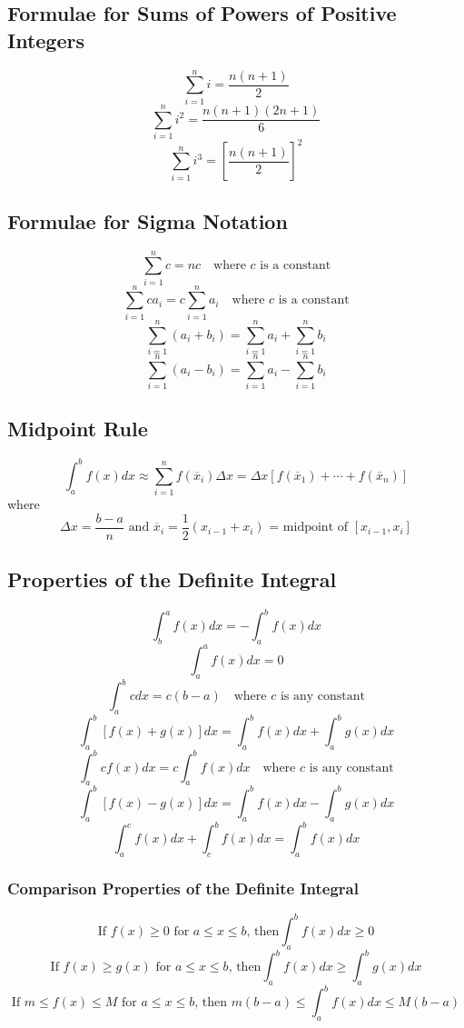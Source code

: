 \subsection*{Formulae for Sums of Powers of Positive Integers}

$$ \sum_{i=1}^n i=\frac{n(n+1)}{2} $$
$$ \sum_{i=1}^n i^2=\frac{n(n+1)(2n+1)}{6} $$
$$ \sum_{i=1}^n i^3= {\left [ \frac{n(n+1)}{2} \right]}^2 $$

\subsection*{Formulae for Sigma Notation}

$$ \sum_{i=1}^n c=nc \quad \text{where } c \text{ is a constant} $$
$$ \sum_{i=1}^n ca_i=c \sum_{i=1}^n a_i \quad \text{where } c \text{ is a constant} $$
$$ \sum_{i=1}^n (a_i+b_i)=\sum_{i=1}^n a_i + \sum_{i=1}^n b_i $$
$$ \sum_{i=1}^n (a_i-b_i)=\sum_{i=1}^n a_i - \sum_{i=1}^n b_i $$

\subsection*{Midpoint Rule}

$$ \int_a^b f(x)dx \approx \sum_{i=1}^{n} f(\overline{x}_i) \Delta x = \Delta x [f(\overline{x}_1)+\cdots+f(\overline{x}_n)]$$
where 
$$ \Delta x = \frac{b-a}{n} \text{ and } \overline{x}_i = \frac{1}{2}(x_{i-1} + x_i) \text{ = midpoint of } [x_{i-1},x_i] $$

\subsection*{Properties of the Definite Integral}

$$ \int_b^a f(x)dx = -\int_a^b f(x)dx $$
$$ \int_a^a f(x)dx = 0 $$
$$ \int_a^b c dx = c(b-a) \quad \text{where } c \text{ is any constant} $$
$$ \int_a^b [f(x)+g(x)] dx = \int_a^b f(x)dx + \int_a^b g(x)dx $$
$$ \int_a^b cf(x) dx = c\int_a^b f(x) dx \quad \text{where } c \text{ is any constant} $$
$$ \int_a^b [f(x)-g(x)] dx = \int_a^b f(x)dx - \int_a^b g(x)dx $$
$$ \int_a^c f(x) dx + \int_c^b f(x)dx = \int_a^b f(x)dx $$

\subsubsection*{Comparison Properties of the Definite Integral}

$$ \text{If } f(x) \geq 0 \text{ for } a \leq x \leq b \text{, then} \int_a^b f(x)dx \geq 0 $$
$$ \text{If } f(x) \geq g(x) \text{ for } a \leq x \leq b \text{, then} \int_a^b f(x)dx \geq \int_a^b g(x)dx $$
$$ \text{If } m \leq f(x) \leq M \text{ for } a \leq x \leq b \text{, then } m(b-a) \leq \int_a^b f(x)dx \leq M(b-a) $$
